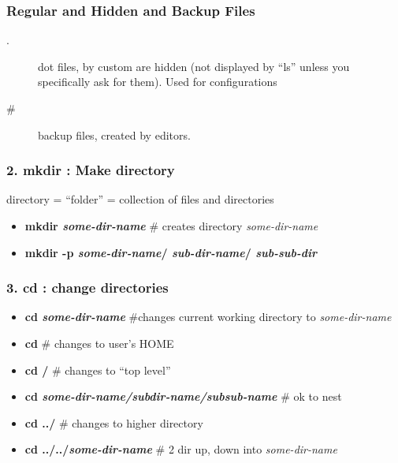 \documentclass[English]{beamer}
\begin{document}
\begin{frame}[containsverbatim]
  \frametitle{Regular and Hidden and Backup Files}
  \begin{description}
  \item[.] dot files, by custom are hidden (not displayed by ``ls''
    unless you specifically ask for them). Used for configurations
    
  \item[\#] backup files, created by editors.
\end{description}
\end{frame}

\begin{frame}
  \frametitle{2. mkdir : Make directory}
  directory = ``folder'' = collection of files and directories
  \begin{itemize}
  \item\textbf{ mkdir \emph{some-dir-name}} \# creates directory \emph{some-dir-name}
  \item \textbf{mkdir -p  \emph{some-dir-name}/ \emph{sub-dir-name}/ \emph{sub-sub-dir}}
  \end{itemize} 
\end{frame}


\begin{frame}
  \frametitle{3. cd : change directories}
  
  \begin{itemize}

  \item \textbf{cd \emph{some-dir-name}} \#changes current working directory to  \emph{some-dir-name}
  \item \textbf{cd }  \# changes to user's HOME
  \item \textbf{ cd /} \#  changes to ``top level''
  \item \textbf{cd \emph{some-dir-name/subdir-name/subsub-name}} \# ok to nest
  \item \textbf{cd ../} \# changes to higher directory
  \item \textbf{cd ../../\emph{some-dir-name}} \#  2 dir up, down into \emph{some-dir-name}
  \end{itemize} 
 
\end{frame}
\end{document}
